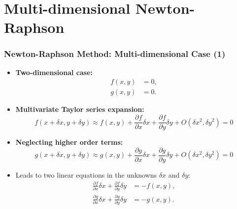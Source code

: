 \section{Multi-dimensional Newton-Raphson}
\begin{frame}[fragile]
    \frametitle{Newton-Raphson Method: Multi-dimensional Case (1)}

    \begin{itemize}
        \item \textbf{Two-dimensional case:}
        \begin{align*}
            f(x, y) &= 0, \\
            g(x, y) &= 0.
        \end{align*}
        
        \item \textbf{Multivariate Taylor series expansion:}
        \[
            f(x + \delta x, y + \delta y) \approx f(x, y) + \frac{\partial f}{\partial x} \delta x + \frac{\partial f}{\partial y} \delta y + O(\delta x^2, \delta y^2) = 0
        \]
        
        \item \textbf{Neglecting higher order terms:}
        \[
            g(x + \delta x, y + \delta y) \approx g(x, y) + \frac{\partial g}{\partial x} \delta x + \frac{\partial g}{\partial y} \delta y + O(\delta x^2, \delta y^2) = 0
        \]
        
        \item Leads to two linear equations in the unknowns \(\delta x\) and \(\delta y\):
        \begin{align*}
            \frac{\partial f}{\partial x} \delta x + \frac{\partial f}{\partial y} \delta y &= -f(x, y), \\
            \frac{\partial g}{\partial x} \delta x + \frac{\partial g}{\partial y} \delta y &= -g(x, y).
        \end{align*}
    \end{itemize}
\end{frame}

